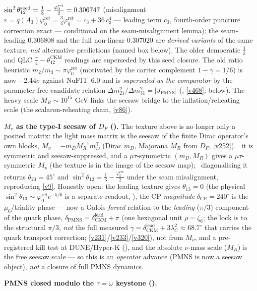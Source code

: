 \documentclass[11pt,a4paper]{article}
\newcommand{\cthree}{c_3}
\newcommand{\phiz}{\varphi_0^{\mathrm{ret}}}
\theoremstyle{definition}
\begin{document}
$\sin^2\theta_{12}^{\rm seed}=\tfrac13-\tfrac{\phiz}{2}=0.306747$ (misalignment
$\varepsilon=q(A_3)\phiz=\tfrac34\phiz=\cthree+36\,\cthree^4$ --- leading term $\cthree$, fourth-order
puncture correction exact --- conditional on the seam-misalignment lemma); the seam-leading $0.306808$ and
the full non-linear $0.307020$ are \emph{derived variants} of the same texture, \emph{not} alternative
predictions (named box below). The
older democratic $\tfrac13$ and QLC $\tfrac\pi4{-}\theta_{12}^{\mathrm{CKM}}$ readings are superseded by this
seed closure. The old ratio heuristic
$m_2/m_3\sim\pi\phiz$ (motivated by the carrier complement $1-\gamma=1/6$) is now $-2.44\sigma$ against
NuFIT~6.0 and is \emph{superseded as the comparator} by the parameter-free candidate relation
$\Delta m^2_{21}/\Delta m^2_{31}=|J_{\mathrm{PMNS}}|$ (\mO, \vref{v468}; below). The heavy scale $M_R\sim10^{15}$ GeV links the seesaw bridge to the
inflation/reheating scale (the scalaron-reheating chain, \vref{v86}).
\par\smallskip\noindent\textbf{$M_\nu$ as the type-I seesaw of $D_F$ ().}
The texture above is no longer only a posited matrix: the light mass matrix is the seesaw of the finite
Dirac operator's own blocks, $M_\nu=-m_D M_R^{-1} m_D^\top$ (Dirac $m_D$, Majorana $M_R$ from $D_F$,
\vref{v252}). \mE\ it is symmetric and seesaw-suppressed, and a $\mu\tau$-symmetric $(m_D,M_R)$ gives a
$\mu\tau$-symmetric $M_\nu$ (the texture is in the image of the seesaw map); \mC\ diagonalising it returns
$\theta_{23}=45^\circ$ and $\sin^2\theta_{12}=\tfrac13-\tfrac{\phiz}{2}$ under the seam misalignment,
reproducing \vref{v9}. Honestly open: the leading texture gives $\theta_{13}=0$ (the physical
$\sin^2\theta_{13}\sim\phiz e^{-5/6}$ is a separate readout, \mO), the CP \emph{magnitude}
$\delta_{\mathrm{CP}}=240^\circ$ is the $\mu_6$/triality phase --- now a Galois-\emph{forced} relation to the
\emph{leading} ($\pi/3$) component of the quark phase, $\delta_{\mathrm{PMNS}}=\delta_{\mathrm{CKM}}^{\mathrm{lead}}+\pi$
(one hexagonal unit $\rho=\zeta_6$; the lock is to the structural $\pi/3$, \emph{not} the full measured
$\gamma=\delta_{\mathrm{CKM}}^{\mathrm{lead}}+3\lambda_C^2\approx68.7^\circ$ that carries the quark transport
correction; \vref{v231}/\vref{v233}/\vref{v320}), not from $M_\nu$, and a pre-registered kill test at
DUNE/Hyper-K (\mX),
and the absolute $\nu$-mass scale ($M_R$) is the free seesaw scale --- so this is an \emph{operator}
advance (PMNS is now a seesaw object), \emph{not} a closure of full PMNS dynamics.
\par\smallskip\noindent\textbf{PMNS closed modulo the $\tau{=}\omega$ keystone ().}
\end{document}
